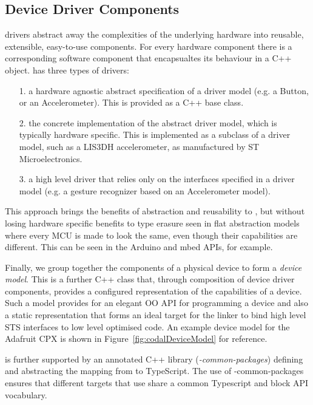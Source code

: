\subsection{Device Driver Components}
\CO drivers abstract away the complexities of the underlying hardware into reusable, extensible, easy-to-use components. For every hardware component there is a corresponding software component that encapsualtes its behaviour in a C++ object. \CO has three types of drivers:
\begin{itemize}
    \item[1.] a hardware agnostic abstract specification of a driver model (e.g. a Button, or an Accelerometer). This is provided as a C++ base class.
    \item[2.] the concrete implementation of the abstract driver model, which is typically hardware specific. This is implemented as a subclass of a driver model, such as a LIS3DH accelerometer, as manufactured by ST Microelectronics.
    \item[3.] a high level driver that relies only on the interfaces specified in a driver model (e.g. a gesture recognizer based on an Accelerometer model).

\end{itemize}

This approach brings the benefits of abstraction and reusability to \CO, but without losing hardware specific benefits to type erasure seen in flat abstraction models where every MCU is made to look the same, even though their capabilities are different. This can be seen in the Arduino and mbed APIs, for example.

Finally, we group together the components of a physical device to form a \emph{device model}. This is a further C++ class that, through composition of device driver components, provides a configured representation of the capabilities of a device. Such a model provides for an elegant OO API for programming a device and also a static representation that forms an ideal target for the \MCN linker to bind high level STS interfaces to low level optimised code. An example device model for the Adafruit CPX is shown in Figure~\ref{fig:codalDeviceModel} for reference.

 \MCN is further supported by an annotated C++ library (\emph{\MC-common-packages}) defining and abstracting the mapping from \CO to TypeScript. The use of \MC-common-packages ensures that different \MCN targets that use \CO share a common Typescript and block API vocabulary.



